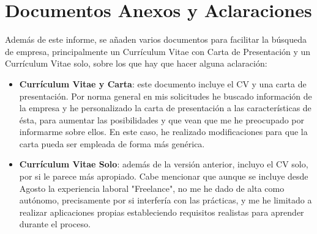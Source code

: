 \section{Documentos Anexos y Aclaraciones}
Además de este informe, se añaden varios documentos para facilitar la búsqueda de empresa, principalmente un Currículum Vitae con Carta de Presentación y un Currículum Vitae solo, sobre los que hay que hacer alguna aclaración:

\begin{itemize}
	\item \textbf{Currículum Vitae y Carta}: este documento incluye el CV y una carta de presentación. Por norma general en mis solicitudes he buscado información de la empresa y he personalizado la carta de presentación a las características de ésta, para aumentar las posibilidades y que vean que me he preocupado por informarme sobre ellos. En este caso, he realizado modificaciones para que la carta pueda ser empleada de forma más genérica.
	\item \textbf{Currículum Vitae Solo}: además de la versión anterior, incluyo el CV solo, por si le parece más apropiado. Cabe mencionar que aunque se incluye desde Agosto la experiencia laboral "Freelance", no me he dado de alta como autónomo, precisamente por si interfería con las prácticas, y me he limitado a realizar aplicaciones propias estableciendo requisitos realistas para aprender durante el proceso.
\end{itemize}







%

